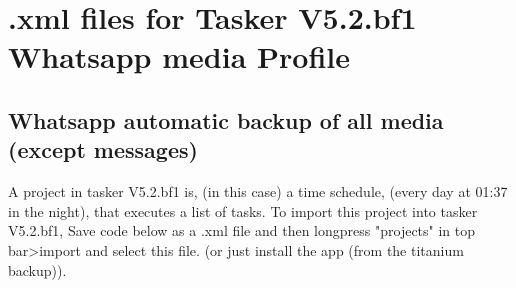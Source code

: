 \section{.xml files for Tasker V5.2.bf1 Whatsapp media Profile}\label{app:A}
\subsection{Whatsapp automatic backup of all media (except messages)}
A project in tasker V5.2.bf1 is, (in this case) a time schedule, (every day at 01:37 in the night), that executes a list of tasks. To import this project into tasker V5.2.bf1, Save code below as a .xml file and then longpress "projects" in top bar>import and select this file. (or just install the app (from the titanium backup)). 
\\
\\

